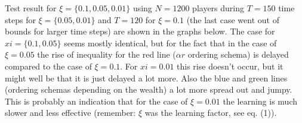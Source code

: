 \documentclass{article}
\begin{document}
Test result for $\xi = \{0.1, 0.05, 0.01 \}$ using $N=1200$ players during $T = 150$ time steps for $\xi = \{0.05, 0.01 \}$ and $T = 120$ for $\xi = 0.1$ (the last case went out of bounds for larger time steps) are shown in the graphs below. The case for $xi = \{0.1, 0.05\}$ seems mostly identical, but for the fact that in the case of $\xi = 0.05$ the rise of inequality for the red line ($\alpha r$ ordering schema) is delayed compared to the case of $\xi = 0.1$. For $xi = 0.01$ this rise doesn't occur, but it might well be that it is just delayed a lot more. Also the blue and green lines (ordering schemas depending on the wealth) a lot more spread out and jumpy. This is probably an indication that for the case of $\xi=0.01$ the learning is much slower and less effective (remember: $\xi$ was the learning factor, see eq. (1)). 
\end{document}
